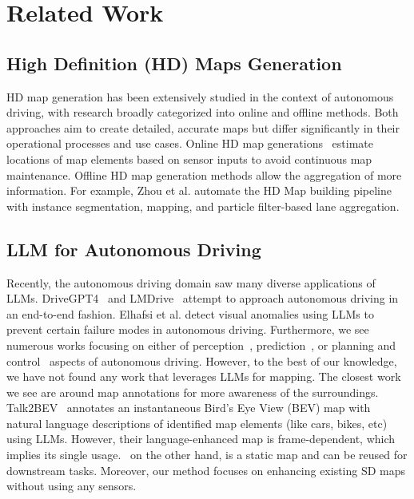 \section{Related Work}
\label{related_work}
\subsection{High Definition (HD) Maps Generation}
HD map generation has been extensively studied in the context of autonomous
driving, with research broadly categorized into online and offline methods. Both
approaches aim to create detailed, accurate maps but differ significantly in
their operational processes and use cases. Online HD map
generations~\cite{li2021hdmapnet,li2023toponet,MapTR,ranganatha2024semvecnetgeneralizablevectormap,
  ory_iros2024} estimate locations of map elements based on sensor inputs to
avoid continuous map maintenance. Offline HD map generation methods allow the
aggregation of more information. For example, Zhou et
al.\cite{Zhou2021IROS_HDmap} automate the HD Map building pipeline with instance
segmentation, mapping, and particle filter-based lane aggregation.

\subsection{LLM for Autonomous Driving}
Recently, the autonomous driving domain saw many diverse applications of LLMs.
DriveGPT4~\cite{drivegpt4} and LMDrive~\cite{lmdrive} attempt to approach
autonomous driving in an end-to-end fashion. Elhafsi et al.
\cite{anomalydetection} detect visual anomalies using LLMs to prevent certain
failure modes in autonomous driving. Furthermore, we see numerous works focusing
on either of perception~\cite{hilmd}, prediction~\cite{llm_mp, mtd_gpt, lcllm},
or planning and control~\cite{planagent, dme_driver, agent_driver} aspects of
autonomous driving. However, to the best of our knowledge, we have not found any
work that leverages LLMs for mapping. The closest work we see are around map
annotations for more awareness of the surroundings. Talk2BEV~\cite{talk2bev}
annotates an instantaneous Bird's Eye View (BEV) map with natural language
descriptions of identified map elements (like cars, bikes, etc) using LLMs.
However, their language-enhanced map is frame-dependent, which implies its
single usage. \our\ on the other hand, is a static map and can be reused for
downstream tasks. Moreover, our method focuses on enhancing existing SD maps
without using any sensors.

